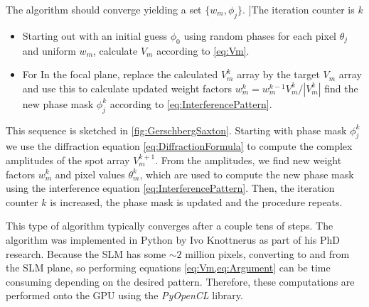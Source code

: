 The algorithm should converge yielding a set $\{w_m, \phi_j\}$. 
]The iteration counter is $k$

\begin{itemize}
    \item Starting out with an initial guess $\phi_0$ using random phases for each pixel $\theta_j$ and uniform $w_m$, calculate $V_m$ according to \cref{eq:Vm}. 
    
    \item For In the focal plane, replace the calculated $V_m^k$ array by the target $V_m$ array and use this to calculate updated weight factors $w_m^k = w_m^{k-1} V_m^k / |V_m^k|$ find the new phase mask $\phi_j^k$ according to \cref{eq:InterferencePattern}.
\end{itemize}

This sequence is sketched in \cref{fig:GerschbergSaxton}. 
Starting with phase mask $\phi_j^k$ we use the diffraction equation \cref{eq:DiffractionFormula} to compute the complex amplitudes of the spot array $V_m^{k+1}$. 
From the amplitudes, we find new weight factors $w_m^k$ and pixel values $\theta_m^k$, which are used to compute the new phase mask using the interference equation \cref{eq:InterferencePattern}.
Then, the iteration counter $k$ is increased, the phase mask is updated and the procedure repeats. 

This type of algorithm typically converges after a couple tens of steps. The algorithm was implemented in Python by Ivo Knottnerus as part of his PhD research.
Because the SLM has some $\sim 2$ million pixels, converting to and from the SLM plane, so performing equations \cref{eq:Vm,eq:Argument} can be time consuming depending on the desired pattern.
Therefore, these computations are performed onto the GPU using the \textit{PyOpenCL} library. 

